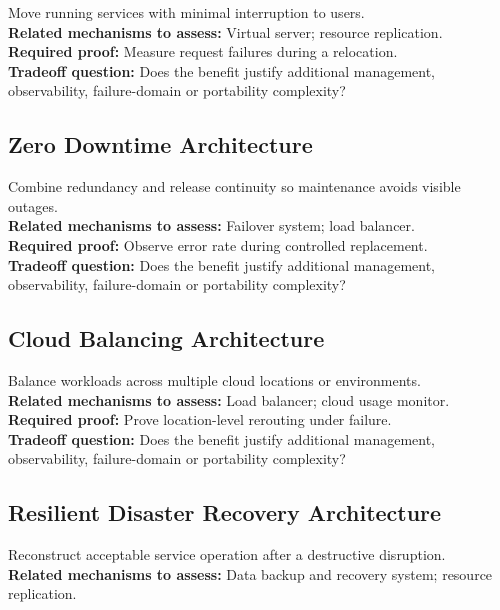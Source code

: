 \documentclass[10pt,letterpaper]{article}
\begin{document}
Move running services with minimal interruption to users.\\[3pt]
\textbf{Related mechanisms to assess:} Virtual server; resource replication.\\[3pt]
\textbf{Required proof:} Measure request failures during a relocation.\\[3pt]
\textbf{Tradeoff question:} Does the benefit justify additional management, observability, failure-domain or portability complexity?\\[3pt]
\subsection{Zero Downtime Architecture}
Combine redundancy and release continuity so maintenance avoids visible outages.\\[3pt]
\textbf{Related mechanisms to assess:} Failover system; load balancer.\\[3pt]
\textbf{Required proof:} Observe error rate during controlled replacement.\\[3pt]
\textbf{Tradeoff question:} Does the benefit justify additional management, observability, failure-domain or portability complexity?\\[3pt]
\subsection{Cloud Balancing Architecture}
Balance workloads across multiple cloud locations or environments.\\[3pt]
\textbf{Related mechanisms to assess:} Load balancer; cloud usage monitor.\\[3pt]
\textbf{Required proof:} Prove location-level rerouting under failure.\\[3pt]
\textbf{Tradeoff question:} Does the benefit justify additional management, observability, failure-domain or portability complexity?\\[3pt]
\subsection{Resilient Disaster Recovery Architecture}
Reconstruct acceptable service operation after a destructive disruption.\\[3pt]
\textbf{Related mechanisms to assess:} Data backup and recovery system; resource replication.\\[3pt]
\end{document}
